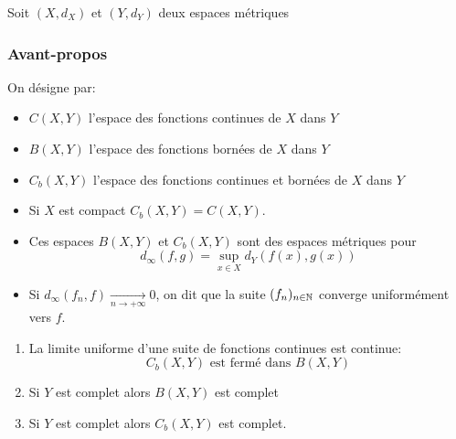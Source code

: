 \documentclass[]{report}
\begin{document}
    Soit $(X,d_X)$ et $(Y,d_Y)$ deux espaces métriques

    \subsubsection*{Avant-propos}

    On désigne par:
    \begin{itemize}
        \item $C(X,Y)$ l'espace des fonctions continues de $X$ dans $Y$
        \item $B(X,Y)$ l'espace des fonctions bornées de $X$ dans $Y$
        \item $C_b(X,Y)$ l'espace des fonctions continues et bornées de $X$ dans $Y$
    \end{itemize}

    \begin{re}{}{}
        \begin{itemize}
            \item Si $X$ est compact $C_b(X,Y)=C(X,Y)$.
            \item Ces espaces $B(X,Y)$ et $C_b(X,Y)$ sont des espaces métriques pour 
            \[d_\infty(f,g)=\sup_{x\in X}d_Y(f(x),g(x))\]
            \item Si $d_\infty(f_n,f)\underset{n\to +\infty}{\longrightarrow}0$, on dit que la suite $(f_n)_{n\in\mathbb{N}}$ converge uniformément vers $f$.
        \end{itemize}
    \end{re}

    \begin{prop}{}{}
        \begin{enumerate}
            \item La limite uniforme d'une suite de fonctions continues est continue:
            \[C_b(X,Y)\text{ est fermé dans $B(X,Y)$}\]
            \item Si $Y$ est complet alors $B(X,Y)$ est complet
            \item Si $Y$ est complet alors $C_b(X,Y)$ est complet.
        \end{enumerate}
    \end{prop}
\end{document}
